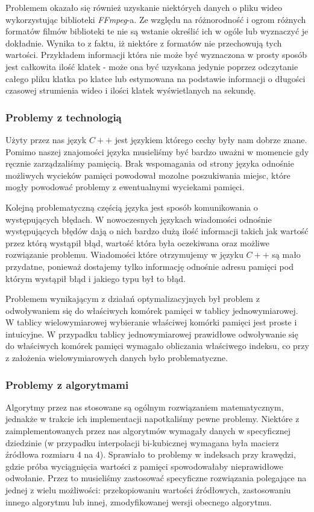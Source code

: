 \documentclass[twoside]{projektInzynierskiMS}
\begin{document}
Problemem okazało się również uzyskanie niektórych danych o pliku wideo wykorzystując biblioteki \emph{FFmpeg}-a. Ze względu na różnorodność i ogrom różnych formatów filmów biblioteki te nie są wstanie określić ich w ogóle lub wyznaczyć je dokładnie. Wynika to z faktu, iż niektóre z formatów nie przechowują tych wartości. Przykładem informacji która nie może być wyznaczona w prosty sposób jest całkowita ilość klatek - może ona być uzyskana jedynie poprzez odczytanie całego pliku klatka po klatce lub estymowana na podstawie informacji o długości czasowej strumienia wideo i ilości klatek wyświetlanych na sekundę.

\subsubsection{Problemy z technologią}
Użyty przez nas język $C++$ jest językiem którego cechy były nam dobrze znane. Pomimo naszej znajomości języka musieliśmy być bardzo uważni w momencie gdy ręcznie zarządzaliśmy pamięcią. Brak wspomagania od strony języka odnośnie możliwych wycieków pamięci powodował mozolne poszukiwania miejsc, które mogły powodować problemy z ewentualnymi wyciekami pamięci. 

Kolejną problematyczną częścią języka jest sposób komunikowania o występujących błędach. W nowoczesnych językach wiadomości odnośnie występujących błędów dają o nich bardzo dużą ilość informacji takich jak wartość przez którą wystąpił błąd, wartość która była oczekiwana oraz możliwe rozwiązanie problemu. Wiadomości które otrzymujemy w języku $C++$ są mało przydatne, ponieważ dostajemy tylko informację odnośnie adresu pamięci pod którym wystąpił błąd i jakiego typu był to błąd.

Problemem wynikającym z działań optymalizacyjnych był problem z odwoływaniem się do właściwych komórek pamięci w tablicy jednowymiarowej. W tablicy wielowymiarowej wybieranie właściwej komórki pamięci jest proste i intuicyjne. W przypadku tablicy jednowymiarowej prawidłowe odwoływanie się do właściwych komórek pamięci wymagało obliczania właściwego indeksu, co przy z założenia wielowymiarowych danych było problematyczne.

\subsubsection{Problemy z algorytmami}
Algorytmy przez nas stosowane są ogólnym rozwiązaniem matematycznym, jednakże w trakcie ich implementacji napotkaliśmy pewne problemy. Niektóre z zaimplementowanych przez nas algorytmów wymagały danych w specyficznej dziedzinie (w przypadku interpolacji bi-kubicznej wymagana była macierz źródłowa rozmiaru 4 na 4). Sprawiało to problemy w indeksach przy krawędzi, gdzie próba wyciągnięcia wartości z pamięci spowodowałaby nieprawidłowe odwołanie. Przez to musieliśmy zastosować specyficzne rozwiązania polegające na jednej z wielu możliwości: przekopiowaniu wartości źródłowych, zastosowaniu innego algorytmu lub innej, zmodyfikowanej wersji obecnego algorytmu.
\end{document}

